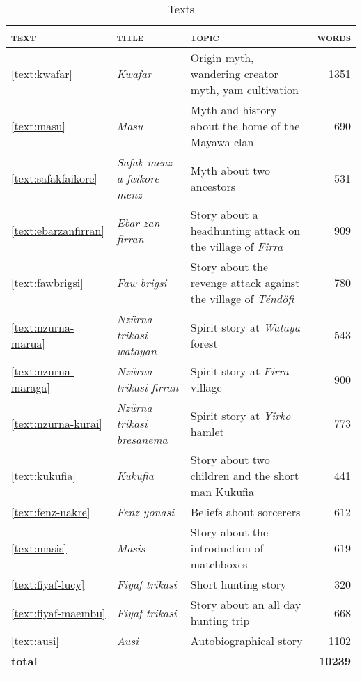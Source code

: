 \begin{table}
\caption{Texts}
\label{tab:texts}
    \centering
	\begin{tabularx}{\textwidth}{llQr}
    \lsptoprule
        \textsc{text} & \textsc{title} & \textsc{topic} & \textsc{words}\\
	\midrule
		\ref{text:kwafar}&\textit{Kwafar} & Origin myth, wandering creator myth, yam cultivation & 1351\\
        \ref{text:masu}&\textit{Masu} & Myth and history about the home of the Mayawa clan & 690\\
        \ref{text:safakfaikore}&\textit{Safak menz a faikore menz}& Myth about two ancestors&531\\
        \ref{text:ebarzanfirran}&\textit{Ebar zan firran}&Story about a headhunting attack on the village of \textit{Firra}&909\\
        \ref{text:fawbrigsi}&\textit{Faw brigsi}&Story about the revenge attack against the village of \textit{Téndöfi}&780\\
        \ref{text:nzurna-marua}&\textit{Nzürna trikasi watayan}&Spirit story at \textit{Wataya} forest&543\\
        \ref{text:nzurna-maraga}&\textit{Nzürna trikasi firran}&Spirit story at \textit{Firra} village&900\\
        \ref{text:nzurna-kurai}&\textit{Nzürna trikasi bresanema}&Spirit story at \textit{Yirko} hamlet&773\\
        \ref{text:kukufia}&\textit{Kukufia}&Story about two children and the short man Kukufia&441\\
        \ref{text:fenz-nakre}&\textit{Fenz yonasi}&Beliefs about sorcerers&612\\
        \ref{text:masis}&\textit{Masis}&Story about the introduction of matchboxes&619\\
        \ref{text:fiyaf-lucy}&\textit{Fiyaf trikasi}&Short hunting story&320\\
        \ref{text:fiyaf-maembu}&\textit{Fiyaf trikasi}&Story about an all day hunting trip&668\\
        \ref{text:ausi}&\textit{Ausi}&Autobiographical story&1102\\
    \midrule
        \textbf{total}&&&\textbf{10239}\\
    \lspbottomrule
\end{tabularx}
\end{table} 
